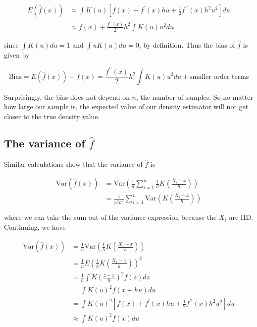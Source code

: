 \begin{align*}
E(\hat{f}(x)) & \approx \int K\left( u \right) \left[ f(x) + f^\prime(x) h u + \frac12 f^{\prime \prime}(x) h^2 u^2 \right] du \\ 
& \approx f(x) + \frac{f^{\prime \prime}(x)}{2} h^2 \int K(u) u^2 du 
\end{align*}


since $\int K(u) du = 1$ and $\int u K(u) du = 0$, by definition. Thus the bias of $\hat{f}$ is given by

$$\text{Bias} = E(\hat{f}(x)) - f(x) = \frac{f^{\prime \prime}(x)}{2} h^2 \int K(u) u^2 du  + \text{smaller order terms}$$

Surprisingly, the bias does not depend on $n$, the number of samples. So no matter how large our sample is, the expected value of our density estimator will not get closer to the true density value.

\subsection*{The variance of $\hat{f}$}


Similar calculations show that the variance of $\hat{f}$ is


\begin{align*}
\text{Var}(\hat{f}(x)) &= \text{Var}\left( \frac{1}{n} \sum_{i=1}^n \frac{1}{h} K \left( \frac{X_i - x}{h} \right) \right)\\
& = \frac{1}{n^2h^2} \sum_{i=1}^n \text{Var}\left( K \left( \frac{X_i - x}{h} \right) \right)
\end{align*}


where we can take the sum out of the variance expression because the $X_i$ are IID. Continuing, we have


\begin{align*}
\text{Var}(\hat{f}(x)) &=  \frac{1}{n}  \text{Var}\left( \frac{1}{h} K \left( \frac{X_1 - x}{h} \right) \right) \\
& = \frac{1}{n}  E \left( \frac {1}{h}K \left( \frac{X_1 - x}{h} \right) \right)^2  \\
&= \frac{1}{h} \int K\left( \frac{z - x}{h} \right)^2 f(z) dz\\
& = \int K(u)^2 f(x + hu) du\\
& = \int K(u)^2 \left[ f(x) + f^\prime(x) h u + \frac12 f^{\prime \prime}(x) h^2 u^2 \right] du\\
& \approx \int K(u)^2 f(x) du 
\end{align*}

